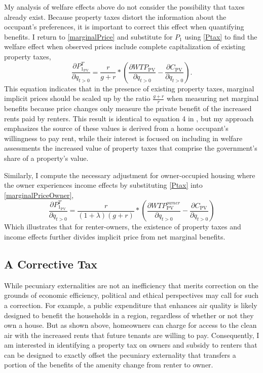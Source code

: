 \documentclass[ecta,nameyear,draft]{econsocart}
\theoremstyle{plain}
\theoremstyle{remark}
\begin{document}
My analysis of welfare effects above do not consider the possibility that taxes already exist. Because property taxes distort the information about the occupant's preferences, it is important to correct this effect when quantifying benefits. I return to \ref{marginalPrice} and substitute for $P_1$ using \ref{Ptax} to find the welfare effect when observed prices include complete capitalization of existing property taxes,
\begin{equation}
\frac{\partial P^T_{1_{\mathrm{PV}}}} {\partial q_{t>0}}=\frac{r}{g+r}*\left(\frac{\partial \mathit{WTP}_{\mathrm{PV}}}{\partial q_{t>0}}-\frac{\partial C_{\mathrm{PV}}}{\partial q_{t>0}}\right). \label{marginalPriceT}
\end{equation}
This equation indicates that in the presence of existing property taxes, marginal implicit prices should be scaled up by the ratio $\frac{g+r}{r}$ when measuring net marginal benefits because price changes only measure the private benefit of the increased rents paid by renters. This result is identical to equation 4 in \cite{niskanen77}, but my approach emphasizes the source of these values is derived from a home occupant's willingness to pay rent, while their interest is focused on including in welfare assessments the increased value of property taxes that comprise the government's share of a property's value.

Similarly, I compute the necessary adjustment for owner-occupied housing where the owner experiences income effects by substituting \ref{Ptax} into \ref{marginalPriceOwner},
\begin{equation}
\frac{\partial P^T_{1_{\mathrm{PV}}}} {\partial q_{t>0}}=\frac{r}{(1+\lambda)(g+r)}*\left(
\frac{\partial \mathit{WTP}^{\mathit{owner}}_{\mathrm{PV}}}{\partial q_{t>0}}-\frac{\partial C_{\mathrm{PV}}}{\partial q_{t>0}}\right) \label{marginalPriceOwnerT}
\end{equation}
Which illustrates that for renter-owners, the existence of property taxes and income effects further divides implicit price from net marginal benefits.

\subsection{A Corrective Tax}
While pecuniary externalities are not an inefficiency that merits correction on the grounds of economic efficiency, political and ethical perspectives may call for such a correction. For example, a public expenditure that enhances air quality is likely designed to benefit the households in a region, regardless of whether or not they own a house. But as shown above, homeowners can charge for access to the clean air with the increased rents that future tenants are willing to pay. Consequently, I am interested in identifying a property tax on owners and subsidy to renters that can be designed to exactly offset the pecuniary externality that transfers a portion of the benefits of the amenity change from renter to owner. 
\end{document}
